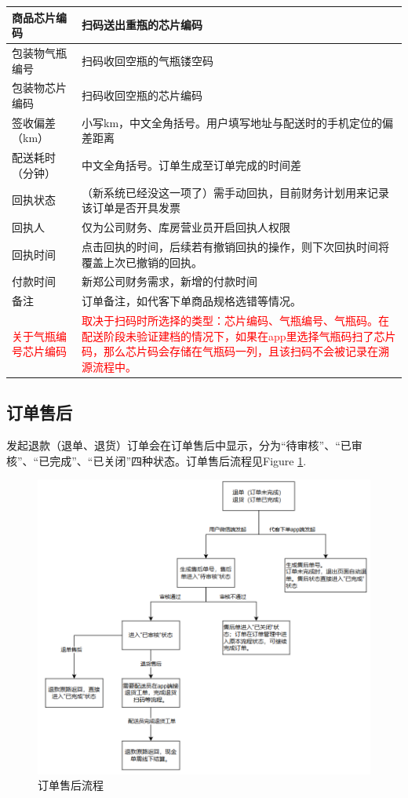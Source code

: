 \documentclass[UTF8]{ctexart}
\begin{document}
\begin{longtable}[h!]{ | m{3cm} | m{12cm} | }
		\hline
		商品芯片编码& 扫码送出重瓶的芯片编码\\
		\hline
		包装物气瓶编号& 扫码收回空瓶的气瓶镂空码\\
		\hline
		包装物芯片编码& 扫码收回空瓶的芯片编码\\
		\hline
		签收偏差（km）& 小写km，中文全角括号。用户填写地址与配送时的手机定位的偏差距离\\
		\hline
		配送耗时（分钟）& 中文全角括号。订单生成至订单完成的时间差\\
		\hline
		回执状态& （新系统已经没这一项了）需手动回执，目前财务计划用来记录该订单是否开具发票\\
		\hline
		回执人	& 仅为公司财务、库房营业员开启回执人权限 \\
		\hline
		回执时间& 点击回执的时间，后续若有撤销回执的操作，则下次回执时间将覆盖上次已撤销的回执。\\
		\hline
		付款时间& 新郑公司财务需求，新增的付款时间\\
		\hline
		备注& 订单备注，如代客下单商品规格选错等情况。\\
		\hline
		\textcolor{red}{关于气瓶编号芯片编码}& \textcolor{red}{取决于扫码时所选择的类型：芯片编码、气瓶编号、气瓶码。在配送阶段未验证建档的情况下，如果在app里选择气瓶码扫了芯片码，那么芯片码会存储在气瓶码一列，且该扫码不会被记录在溯源流程中。}\\
		\hline

\end{longtable}


\subsection{订单售后}

发起退款（退单、退货）订单会在订单售后中显示，分为“待审核”、“已审核”、“已完成”、“已关闭”四种状态。订单售后流程见Figure \ref{fig:chargeback}.

\begin{figure}[h]
	\centering
	\includegraphics[width=1\linewidth]{dlh_tutorial_figs/chargeback}
	\caption{订单售后流程}
	\label{fig:chargeback}
\end{figure}
\end{document}

